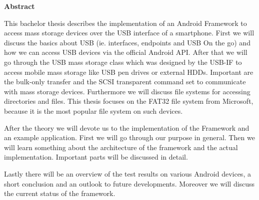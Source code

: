 

\clearemptydoublepage
{}
{}	





\vspace*{2cm}
\begin{center}
{\Large \bf Abstract}
\end{center}
\vspace{1cm}

This bachelor thesis describes the implementation of an Android Framework to access mass storage devices over the USB interface of a smartphone. First we will discuss the basics about USB (ie. interfaces, endpoints and USB On the go) and how we can access USB devices via the official Android API. After that we will go through the USB mass storage class which was designed by the USB-IF to access mobile mass storage like USB pen drives or external HDDs. Important are the bulk-only transfer and the SCSI transparent command set to communicate with mass storage devices. Furthermore we will discuss file systems for accessing directories and files. This thesis focuses on the FAT32 file system from Microsoft, because it is the most popular file system on such devices.

After the theory we will devote us to the implementation of the Framework and an example application. First we will go through our purpose in general. Then we will learn something about the architecture of the framework and the actual implementation. Important parts will be discussed in detail.

Lastly there will be an overview of the test results on various Android devices, a short conclusion and an outlook to future developments. Moreover we will discuss the current status of the framework. 